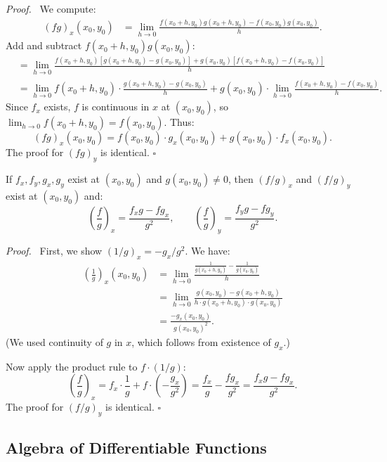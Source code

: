 \documentclass[11pt]{report}
\renewenvironment{proof}[1][Proof]{\par\noindent\textit{#1.}\ }{\hfill$\square$\par\medskip}
\begin{document}
\begin{proof}
We compute:
\begin{align*}
(fg)_x(x_0, y_0) &= \lim_{h \to 0} \frac{f(x_0 + h, y_0) g(x_0 + h, y_0) - f(x_0, y_0) g(x_0, y_0)}{h}.
\end{align*}
Add and subtract $f(x_0 + h, y_0) g(x_0, y_0)$:
\begin{align*}
&= \lim_{h \to 0} \frac{f(x_0 + h, y_0) [g(x_0 + h, y_0) - g(x_0, y_0)] + g(x_0, y_0) [f(x_0 + h, y_0) - f(x_0, y_0)]}{h} \\
&= \lim_{h \to 0} f(x_0 + h, y_0) \cdot \frac{g(x_0 + h, y_0) - g(x_0, y_0)}{h} + g(x_0, y_0) \cdot \lim_{h \to 0} \frac{f(x_0 + h, y_0) - f(x_0, y_0)}{h}.
\end{align*}
Since $f_x$ exists, $f$ is continuous in $x$ at $(x_0, y_0)$, so $\lim_{h \to 0} f(x_0 + h, y_0) = f(x_0, y_0)$. Thus:
\[
(fg)_x(x_0, y_0) = f(x_0, y_0) \cdot g_x(x_0, y_0) + g(x_0, y_0) \cdot f_x(x_0, y_0).
\]
The proof for $(fg)_y$ is identical.
\end{proof}

\begin{theorem}
If $f_x, f_y, g_x, g_y$ exist at $(x_0, y_0)$ and $g(x_0, y_0) \neq 0$, then $(f/g)_x$ and $(f/g)_y$ exist at $(x_0, y_0)$ and:
\[
\left(\frac{f}{g}\right)_x = \frac{f_x g - f g_x}{g^2}, \qquad \left(\frac{f}{g}\right)_y = \frac{f_y g - f g_y}{g^2}.
\]
\end{theorem}

\begin{proof}
First, we show $(1/g)_x = -g_x / g^2$. We have:
\begin{align*}
\left(\frac{1}{g}\right)_x(x_0, y_0) &= \lim_{h \to 0} \frac{\frac{1}{g(x_0 + h, y_0)} - \frac{1}{g(x_0, y_0)}}{h} \\
&= \lim_{h \to 0} \frac{g(x_0, y_0) - g(x_0 + h, y_0)}{h \cdot g(x_0 + h, y_0) \cdot g(x_0, y_0)} \\
&= \frac{-g_x(x_0, y_0)}{g(x_0, y_0)^2}.
\end{align*}
(We used continuity of $g$ in $x$, which follows from existence of $g_x$.)

Now apply the product rule to $f \cdot (1/g)$:
\[
\left(\frac{f}{g}\right)_x = f_x \cdot \frac{1}{g} + f \cdot \left(-\frac{g_x}{g^2}\right) = \frac{f_x}{g} - \frac{f g_x}{g^2} = \frac{f_x g - f g_x}{g^2}.
\]
The proof for $(f/g)_y$ is identical.
\end{proof}

\subsection{Algebra of Differentiable Functions}
\end{document}

